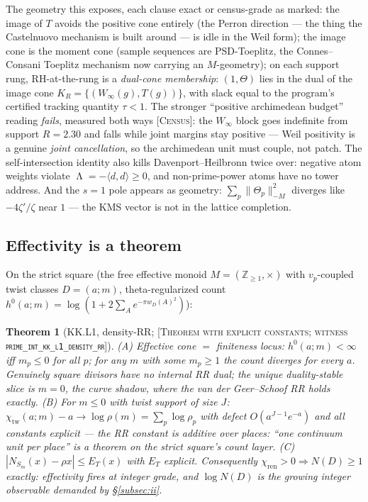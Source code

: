 \documentclass[11pt,reqno]{amsart}
\theoremstyle{plain}
\newtheorem{theorem}{Theorem}[section]
\theoremstyle{definition}
\theoremstyle{remark}
\newcommand{\Z}{\mathbb{Z}}
\newcommand{\grade}[1]{\textup{[\textsc{#1}]}}
\DeclareMathOperator{\Lam}{\Lambda}
\begin{document}
The geometry this exposes, each clause exact or census-grade as marked: the image of $T$
avoids the positive cone entirely (the Perron direction --- the thing the Castelnuovo
mechanism is built around --- is idle in the Weil form); the image cone is the moment cone
(sample sequences are PSD-Toeplitz, the Connes--Consani Toeplitz mechanism \cite{CC20} now
carrying an $M$-geometry); on each support rung, RH-at-the-rung is a \emph{dual-cone
membership}: $(1, \Theta)$ lies in the dual of the image cone
$K_R = \{(W_\infty(g), T(g))\}$, with slack equal to the program's certified tracking
quantity $\tau < 1$. The stronger ``positive archimedean budget'' reading \emph{fails},
measured both ways \grade{Census}: the $W_\infty$ block goes indefinite from support
$R = 2.30$ and falls while joint margins stay positive --- Weil positivity is a genuine
\emph{joint cancellation}, so the archimedean unit must couple, not patch. The
self-intersection identity also kills Davenport--Heilbronn twice over: negative atom weights
violate $\Lam = -\langle d, d\rangle \ge 0$, and non-prime-power atoms have no tower address.
And the $s = 1$ pole appears as geometry: $\sum_p \|\Theta_p\|^2_{-M}$ diverges like
$-4\zeta'/\zeta$ near $1$ --- the KMS vector is not in the lattice completion.

\subsection{Effectivity is a theorem}\label{subsec:kk}

On the strict square (the free effective monoid $M = (\Z_{\ge 1}, \times)$ with
$v_p$-coupled twist classes $D = (a; m)$, theta-regularized count
$h^0(a; m) = \log(1 + 2\sum_A e^{-\pi w_D(A)^2})$):

\begin{theorem}[KK.L1, density-RR;
\grade{Theorem with explicit constants; witness \texttt{prime\_\allowbreak int\_\allowbreak kk\_\allowbreak l1\_\allowbreak density\_\allowbreak rr}}]
\label{thm:kk}
\textup{(A)} \emph{Effective cone $=$ finiteness locus}: $h^0(a; m) < \infty$ iff
$m_p \le 0$ for all $p$; for any $m$ with some $m_p \ge 1$ the count diverges for every
$a$. Genuinely square divisors have no internal RR dual; the unique duality-stable slice is
$m = 0$, the curve shadow, where the van der Geer--Schoof RR \cite{vdGS} holds exactly.
\textup{(B)} For $m \le 0$ with twist support of size $J$:
$\chi_{\mathrm{tw}}(a; m) - a \to \log\rho(m) = \sum_p \log\rho_p$ with defect
$O(a^{J-1}e^{-a})$ and all constants explicit --- the RR constant is \emph{additive over
places}: ``one continuum unit per place'' is a theorem on the strict square's count layer.
\textup{(C)} $|N_{S_m}(x) - \rho x| \le E_T(x)$ with $E_T$ explicit. Consequently
$\chi_{\mathrm{ren}} > 0 \Rightarrow N(D) \ge 1$ exactly: effectivity fires at integer
grade, and $\log N(D)$ is the growing integer observable demanded by
\S\ref{subsec:ii}.
\end{theorem}
\end{document}
